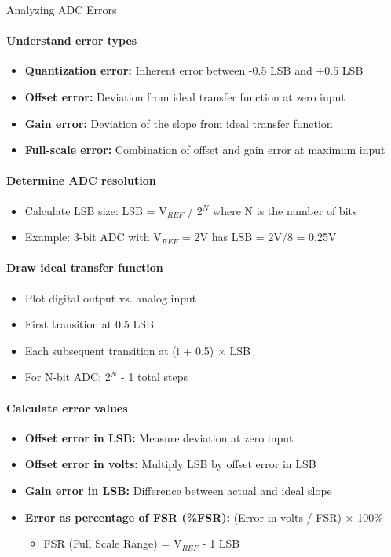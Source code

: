 \begin{KR}{Analyzing ADC Errors}\\
\paragraph{Understand error types}
\begin{itemize}
    \item \textbf{Quantization error:} Inherent error between -0.5 LSB and +0.5 LSB
    \item \textbf{Offset error:} Deviation from ideal transfer function at zero input
    \item \textbf{Gain error:} Deviation of the slope from ideal transfer function
    \item \textbf{Full-scale error:} Combination of offset and gain error at maximum input
\end{itemize}

\paragraph{Determine ADC resolution}
\begin{itemize}
    \item Calculate LSB size: LSB = V$_{REF}$ / 2$^N$ where N is the number of bits
    \item Example: 3-bit ADC with V$_{REF}$ = 2V has LSB = 2V/8 = 0.25V
\end{itemize}

\paragraph{Draw ideal transfer function}
\begin{itemize}
    \item Plot digital output vs. analog input
    \item First transition at 0.5 LSB
    \item Each subsequent transition at (i + 0.5) × LSB
    \item For N-bit ADC: 2$^N$ - 1 total steps
\end{itemize}

\paragraph{Calculate error values}
\begin{itemize}
    \item \textbf{Offset error in LSB:} Measure deviation at zero input
    \item \textbf{Offset error in volts:} Multiply LSB by offset error in LSB
    \item \textbf{Gain error in LSB:} Difference between actual and ideal slope
    \item \textbf{Error as percentage of FSR (\%FSR):} (Error in volts / FSR) × 100\%
    \begin{itemize}
        \item FSR (Full Scale Range) = V$_{REF}$ - 1 LSB
    \end{itemize}
\end{itemize}
\end{KR}

